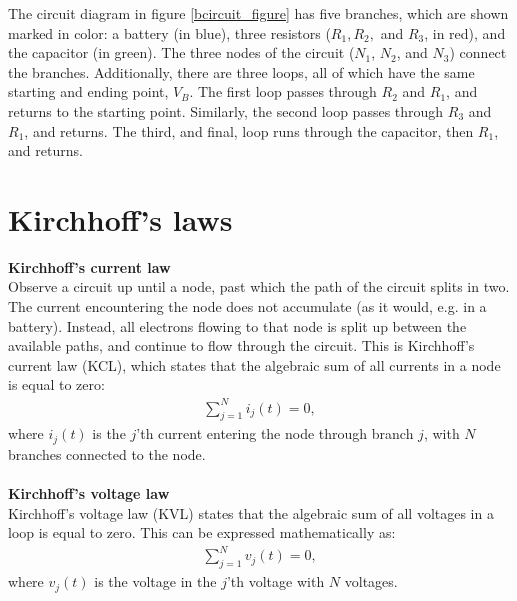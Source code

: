 \noindent The circuit diagram in figure \ref{bcircuit_figure} has five branches, which are shown marked in color: a battery (in blue), three resistors ($R_1, R_2,$ and $R_3$, in red), and the capacitor (in green). The three nodes of the circuit ($N_1$, $N_2$, and $N_3$) connect the branches. Additionally, there are three loops, all of which have the same starting and ending point, $V_{B}$. The first loop passes through $R_2$ and $R_1$, and returns to the starting point. Similarly, the second loop passes through $R_3$ and $R_1$, and returns. The third, and final, loop runs through the capacitor, then $R_1$, and returns. 

\section{Kirchhoff's laws}\label{Klaws}
\textbf{Kirchhoff's current law}
\\
Observe a circuit up until a node, past which the path of the circuit splits in two. The current encountering the node does not accumulate (as it would, e.g. in a battery). Instead, all electrons flowing to that node is split up between the available paths, and continue to flow through the circuit. This is Kirchhoff’s current law (KCL), which states that the algebraic sum of all currents in a node is equal to zero:
\begin{align*}
\sum_{j=1}^{N} i_{j}(t) = 0,
\end{align*}
where $i_{j}(t)$ is the $j$'th current entering the node through branch $j$, with $N$ branches connected to the node. \cite[p.~32]{bcircuit}
\\
\\
\textbf{Kirchhoff's voltage law}
\\
Kirchhoff's voltage law (KVL) states that the algebraic sum of all voltages in a loop is equal to zero. This can be expressed mathematically as:
\begin{align*}
\sum_{j=1}^{N} v_{j}(t) = 0,
\end{align*}
where $v_{j}(t)$ is the voltage in the $j$'th voltage with $N$ voltages. \citep[p.~34]{bcircuit}\\


